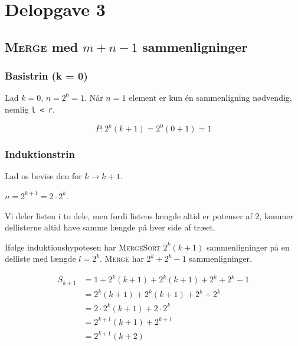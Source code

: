 \section{Delopgave 3}\label{sec:delopgave-33}

\subsection{\textsc{Merge} med \(m + n - 1\) sammenligninger}\label{subsec:merge-med-m-+-n-1-sammenligninger}

\subsubsection{Basistrin (k = 0)}

Lad \(k = 0\), \(n = 2^0 = 1\).
Når \(n = 1\) element er kun én sammenligning nødvendig, nemlig \lstinline{l < r}.

\begin{equation}
    P: 2^k(k + 1) = 2^0(0 + 1) = 1
    \label{eq:equation18}
\end{equation}

\subsubsection{Induktionstrin}

Lad os bevise den for \(k \rightarrow k + 1\).

\(n = 2^{k + 1} = 2 \cdot 2^k\).

Vi deler listen i to dele, men fordi listens længde altid er potenser af \(2\), kommer dellisterne altid have samme
længde på hver side af træet.

Ifølge induktionshypotesen har \textsc{MergeSort} \(2^k(k + 1)\) sammenligninger på en delliste med længde \(l = 2^k\).
\textsc{Merge} har \(2^k + 2^k - 1\) sammenligninger.

\begin{equation}
    \begin{aligned}
        S_{k + 1} & = 1 + 2^k(k + 1) + 2^k(k + 1) + 2^k + 2^k - 1 \\
                  & = 2^k(k + 1) + 2^k(k + 1) + 2^k + 2^k         \\
                  & = 2 \cdot 2^k(k + 1) + 2 \cdot 2^k            \\
                  & = 2^{k + 1}(k + 1) + 2^{k + 1}                \\
                  & = 2^{k + 1}(k + 2)
    \end{aligned}
    \label{eq:equation19}
\end{equation}

